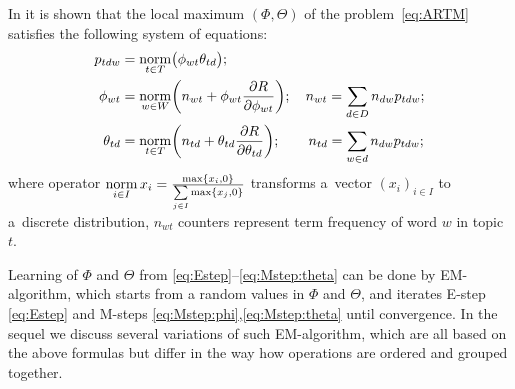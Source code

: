 \documentclass[russian,english]{llncs}
\newcommand{\norm}{\mathop{\rm norm}\limits}
\begin{document}
In \cite{voron14dan-eng} it is shown that the \mbox{local} maximum $(\Phi,\Theta)$
of the problem~\eqref{eq:ARTM} satisfies
the following system of equations:
\begin{align}
    \label{eq:Estep}
    p_{tdw} &= \norm_{t\in T} \bigl(\phi_{wt}\theta_{td}\bigr);
\\
    \label{eq:Mstep:phi}
    \phi_{wt} &= \norm_{w\in W}
        \biggl(
            n_{wt} + \phi_{wt} \frac{\partial R}{\partial \phi_{wt}}
        \biggr);
        \quad
            n_{wt} = \sum_{d\in D} n_{dw} p_{tdw};
\\
    \label{eq:Mstep:theta}
    \theta_{td} &= \norm_{t\in T}
        \biggl(
            n_{td} + \theta_{td} \frac{\partial R}{\partial \theta_{td}}
        \biggr);
        \quad\quad
            n_{td} = \sum_{w\in d} n_{dw} p_{tdw};
\end{align}
where operator
$\norm_{i \in I} x_i = \frac{\max\{x_i,0\}}{\sum\limits_{j\in I} \max\{x_j,0\}}$
transforms a~vector $(x_i)_{i \in I}$ to a~discrete distribution,
$n_{wt}$ counters represent term frequency of word $w$ in topic $t$.

Learning of $\Phi$ and $\Theta$ from \eqref{eq:Estep}--\eqref{eq:Mstep:theta} can be done by EM-algorithm,
which starts from a random values in $\Phi$ and $\Theta$, and iterates
E-step \eqref{eq:Estep} and
M-steps \eqref{eq:Mstep:phi},\eqref{eq:Mstep:theta}
until convergence.
In the sequel we discuss several variations of such EM-algorithm,
which are all based on the above formulas but differ in the way how operations are ordered and grouped together.

\end{document}

